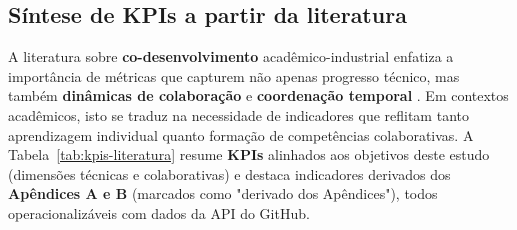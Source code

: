 \documentclass[
	12pt,
	openright,
	oneside,
	a4paper,
	brazil
]{abntex2}
\begin{document}
\subsection{Síntese de KPIs a partir da literatura}

A literatura sobre \textbf{co-desenvolvimento} acadêmico-industrial \cite{jarvela2018collaboration,bjerregaard2021lessons} enfatiza a importância de métricas que capturem não apenas progresso técnico, mas também \textbf{dinâmicas de colaboração} e \textbf{coordenação temporal} \cite{franssen2019cogs}. Em contextos acadêmicos, isto se traduz na necessidade de indicadores que reflitam tanto aprendizagem individual quanto formação de competências colaborativas. A Tabela~\ref{tab:kpis-literatura} resume \textbf{KPIs} alinhados aos objetivos deste estudo (dimensões técnicas e colaborativas) e destaca indicadores derivados dos \textbf{Apêndices A e B} (marcados como "derivado dos Apêndices"), todos operacionalizáveis com dados da API do GitHub.
\end{document}
